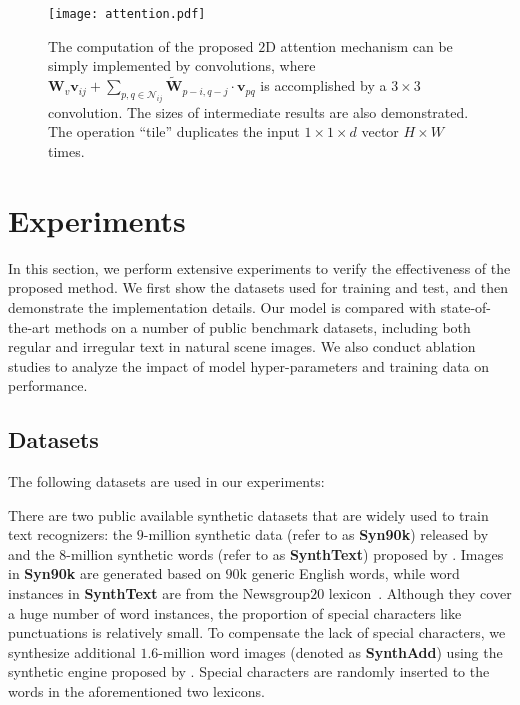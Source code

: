 \documentclass[letterpaper]{article} \usepackage{aaai19}  \usepackage{times}  \usepackage{helvet}  \usepackage{courier}  \usepackage{url}  \usepackage{graphicx}  \usepackage{amsmath}
\begin{document}
\begin{figure}[t]
	\begin{center}
		\texttt{[image: attention.pdf]}
	\end{center}
	\caption{The computation of the proposed $2$D attention mechanism can be simply implemented by convolutions, where
		$\mathbf{W}_v \mathbf{v}_{ij} + {\sum_{p,q \in \mathcal{N}_{ij}}}\! {\mathbf{\tilde{W}}_{p-i,q-j} \cdot \mathbf{v}_{pq}}$
		is accomplished by a $3\times3$ convolution. The sizes of intermediate results are also demonstrated.
		The operation ``tile'' duplicates the input $1\times1\times d$ vector $H \times W$ times.
	}
	\label{fig:attention}
\end{figure}


\section{Experiments}
\label{SEC:Exp}
In this section, we perform extensive experiments to verify the effectiveness of the proposed method. We first show the datasets used for training and test,
and then demonstrate the implementation details.
Our model is compared with state-of-the-art methods on a number of public benchmark datasets, including both regular and irregular text in natural scene images.
We also conduct ablation studies to analyze the impact of model hyper-parameters and training data on performance.



\subsection{Datasets}
The following datasets are used in our experiments:

There are two public available synthetic datasets that are widely used to train text recognizers: the $9$-million synthetic data (refer to as \textbf{Syn90k}) released by \cite{Max2016IJCV} and the $8$-million synthetic words (refer to as \textbf{SynthText}) proposed by \cite{Gupta16}.  Images in \textbf{Syn90k} are generated based on $90$k generic English words, while word instances in \textbf{SynthText} are from the Newsgroup$20$ lexicon~\cite{Lang95}. Although they cover a huge number of word instances, the proportion of special characters like punctuations is relatively small. To compensate the lack of special characters, we synthesize additional $1.6$-million word images (denoted as \textbf{SynthAdd}) using the synthetic engine proposed by \cite{Gupta16}. Special characters are randomly inserted to the words in the aforementioned two lexicons.
\end{document}
